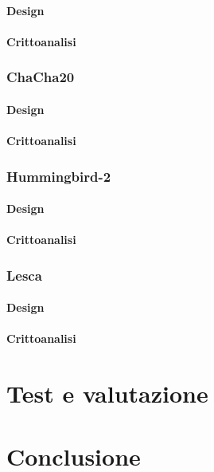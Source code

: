 \documentclass[target=bach,aauheader=,style=]{thud}
\begin{document}
			\subsubsection{Design}
			\subsubsection{Crittoanalisi}
		\subsection{ChaCha20\cite{chacha20}}
			\subsubsection{Design}
			\subsubsection{Crittoanalisi}
		\subsection{Hummingbird-2\cite{hummingbird2}}
			\subsubsection{Design}
			\subsubsection{Crittoanalisi}
		\subsection{Lesca\cite{lesca}}
			\subsubsection{Design}
			\subsubsection{Crittoanalisi}
\chapter{Test e valutazione}

\chapter{Conclusione}
\end{document}
